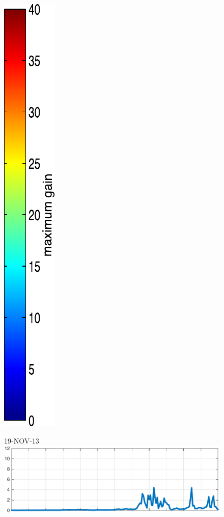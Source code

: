 \begin{figure}
\begin{minipage}[c]{\mylength}
\includegraphics[valign=t,trim=2pt -8pt 0 5pt,width=\colorbarwidth,totalheight=\eventheight]{events/colorbar-40.pdf}
\end{minipage}
\begin{minipage}[c]{\mylength}
\centering \scriptsize 19-NOV-13 \\
\includegraphics[valign=t,trim=0 0 5pt 0,angle=90,origin=tr,width=\sunintwidth,totalheight=\eventheight]{events/20131119-intensity.pdf}

\end{minipage}
\end{figure}
